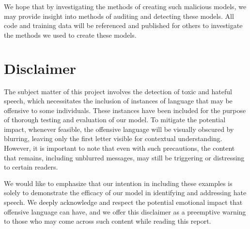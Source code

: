 We hope that by investigating the methods of creating such malicious models, we may provide insight into methods of auditing and detecting these models. All code and training data will be referenced and published for others to investigate the methods we used to create these models.

\section{Disclaimer}

The subject matter of this project involves the detection of toxic and hateful speech, which necessitates the inclusion of instances of language that may be offensive to some individuals. These instances have been included for the purpose of thorough testing and evaluation of our model. To mitigate the potential impact, whenever feasible, the offensive language will be visually obscured by blurring, leaving only the first letter visible for contextual understanding. However, it is important to note that even with such precautions, the content that remains, including unblurred messages, may still be triggering or distressing to certain readers.

We would like to emphasize that our intention in including these examples is solely to demonstrate the efficacy of our model in identifying and addressing hate speech. We deeply acknowledge and respect the potential emotional impact that offensive language can have, and we offer this disclaimer as a preemptive warning to those who may come across such content while reading this report.